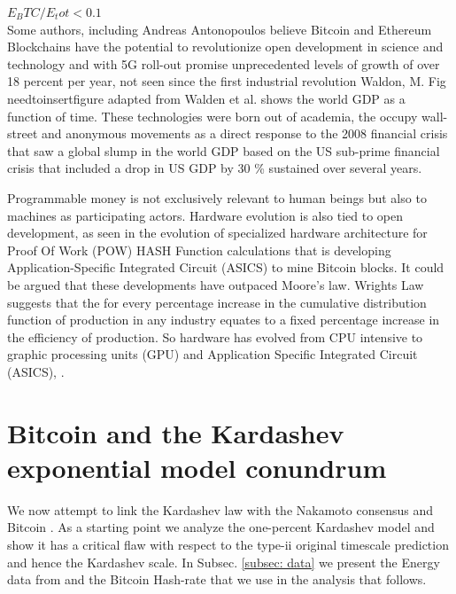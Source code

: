 \documentclass[final,5p,times,twocolumn,authoryear]{elsarticle}
\begin{document}
$E_BTC/E_tot < 0.1$
\\
 Some authors, including Andreas Antonopoulos believe Bitcoin and Ethereum Blockchains have the potential to revolutionize open development in science and technology and with 5G roll-out promise unprecedented levels of growth of over 18 percent per year, not seen since the first industrial revolution Waldon, M.  Fig needtoinsertfigure adapted from Walden et al. shows the world GDP as a function of time. These technologies were born out of academia, the occupy wall-street and anonymous movements as a direct response to the 2008 financial crisis that saw a global slump in the world GDP based on the US sub-prime financial crisis  that included a drop in US GDP by 30 \% sustained over several years.
 
Programmable money is not exclusively relevant to human beings but also to machines as participating actors. Hardware evolution is also tied to open development, as seen in the evolution of specialized hardware architecture for Proof Of Work (POW) HASH Function calculations that is developing Application-Specific Integrated Circuit (ASICS) to mine Bitcoin blocks. It could be argued that these developments have outpaced Moore's law.  Wrights Law suggests that the for every percentage increase in the cumulative distribution function of production in any industry equates to a fixed percentage increase in the efficiency of production. So hardware has evolved from CPU intensive to graphic processing units (GPU) and  Application Specific Integrated Circuit  (ASICS), \cite{10.1371/journal.pone.0052669}.

\section{Bitcoin and the Kardashev exponential model conundrum}
\label{sec:energy}

We now attempt to link the Kardashev law  \cite{kar64} with the Nakamoto consensus and Bitcoin \cite{nak2009}. As a starting point we analyze the one-percent Kardashev model and show it has a critical flaw with respect to the type-ii original timescale prediction and hence the Kardashev scale. In Subsec. \ref{subsec: data} we present the Energy data from \cite{owidenergy} and the Bitcoin Hash-rate that we use in the analysis that follows. 
\end{document}
